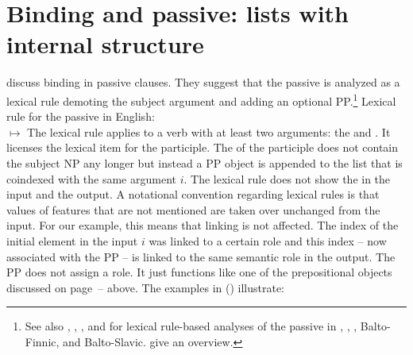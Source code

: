 \documentclass[output=paper,biblatex,babelshorthands,newtxmath,draftmode,colorlinks,citecolor=brown]{langscibook}
\begin{document}
\section{Binding and passive: \texorpdfstring{\argst}{ARG-ST} lists with internal structure}
\label{binding-sec-passive}



\citet{MS98a} discuss binding in passive clauses. They suggest that the passive is analyzed as a
lexical rule demoting the subject argument and adding an optional PP.\footnote{
  See also , , , and  for lexical rule-based analyses of the
  passive in 
, , , Balto-Finnic, and Balto-Slavic.  give an overview.
} 
\ea
Lexical rule for the passive in English:\\
$\mapsto$
\z
The lexical rule applies to a verb with at least two arguments: the \NPi and . It licenses
the lexical item for the participle. The \argstl of the participle does not contain the subject NP
any longer but instead a PP object is appended to the list that is coindexed with the same argument $i$. 
The lexical rule does not show the \contv in the input and the output. A notational convention
regarding lexical rules is that values of features that are not mentioned are taken over unchanged
from the input. For our example, this means that linking is not affected. The index of the initial
element in the input $i$ was linked to a certain role and this index -- now associated with the PP
-- is linked to the same semantic role in the output. The PP does not assign a role. It just
functions like one of the prepositional objects discussed on
page~\pageref{binding:page-prepositional-objects-start}--\pageref{binding:page-prepositional-objects-end}
above. The examples in () illustrate:
\end{document}

